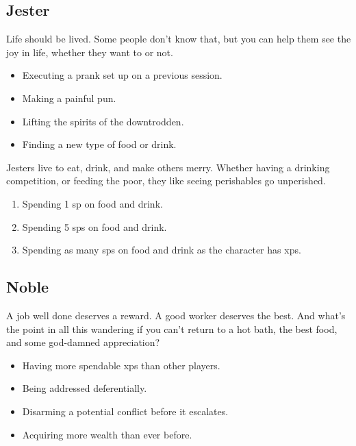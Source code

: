 \begin{multicols}{2}
\subsection{Jester}

Life should be lived.
Some people don't know that, but you can help them see the joy in life, whether they want to or not.

\begin{itemize}
  \item
  Executing a prank set up on a previous session.
  \item
  Making a painful pun.
  \item
  Lifting the spirits of the downtrodden.
  \item
  Finding a new type of food or drink.
\end{itemize}

Jesters live to eat, drink, and make others merry.
Whether having a drinking competition, or feeding the poor, they like seeing perishables go unperished.

\begin{enumerate}
  \item
  Spending 1 \gls{sp} on food and drink.
  \item
  Spending 5 \glspl{sp} on food and drink.
  \item
  Spending as many \glspl{sp} on food and drink as the character has \glspl{xp}.
\end{enumerate}

\subsection{Noble}

A job well done deserves a reward.
A good worker deserves the best.
And what's the point in all this wandering if you can't return to a hot bath, the best food, and some god-damned appreciation?

\begin{itemize}

  \item
  Having more spendable \glspl{xp} than other players.
  \item
  Being addressed deferentially.
  \item
  Disarming a potential conflict before it escalates.
  \item
  Acquiring more wealth than ever before.

\end{itemize}


\end{multicols}

